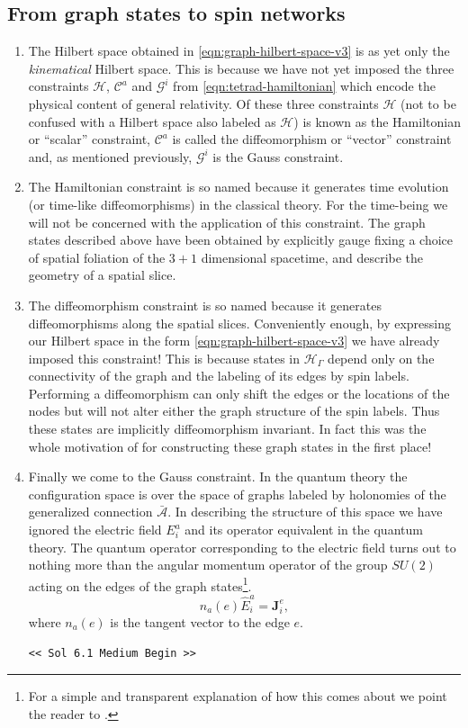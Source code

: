 \documentclass[preprint]{SciPost}
\newcommand{\mb}[1]{\mathbf{#1}}
\newcommand{\mc}[1]{\mathcal{#1}}
\theoremstyle{plain} %
\newcommand{\GPTBegin}{\par\noindent\textcolor{GPTMarker}{\texttt{\textless\textless{} Sol 6.1 Medium Begin \textgreater\textgreater}}\par}
\begin{document}
\subsection*{From graph states to spin networks}
	\begin{enumerate}[label=\arabic*.]
		\item The Hilbert space obtained in \eqref{eqn:graph-hilbert-space-v3} is as yet only the \emph{kinematical} Hilbert space. This is because we have not yet imposed the three constraints $ \mc{H} $, $ \mc{C}^a $ and $ \mc{G}^i $ from \eqref{eqn:tetrad-hamiltonian} which encode the physical content of general relativity. Of these three constraints $ \mc{H} $ (not to be confused with a Hilbert space also labeled as $ \mc{H} $) is known as the Hamiltonian or ``scalar'' constraint, $ \mc{C}^a $ is called the diffeomorphism or ``vector'' constraint and, as mentioned previously, $ \mc{G}^i $ is the Gauss constraint.
		\item The Hamiltonian constraint is so named because it generates time evolution (or time-like diffeomorphisms) in the classical theory. For the time-being we will not be concerned with the application of this constraint. The graph states described above have been obtained by explicitly gauge fixing a choice of spatial foliation of the $ 3+1 $ dimensional spacetime, and describe the geometry of a spatial slice.
		\item The diffeomorphism constraint is so named because it generates diffeomorphisms along the spatial slices. Conveniently enough, by expressing our Hilbert space in the form \eqref{eqn:graph-hilbert-space-v3} we have already imposed this constraint! This is because states in $ \mc{H}_\Gamma $ depend only on the connectivity of the graph and the labeling of its edges by spin labels. Performing a diffeomorphism can only shift the edges or the locations of the nodes but will not alter either the graph structure of the spin labels. Thus these states are implicitly diffeomorphism invariant. In fact this was the whole motivation of \cite{Ashtekar1994A-Manifestly} for constructing these graph states in the first place!
		\item Finally we come to the Gauss constraint. In the quantum theory the configuration space is over the space of graphs labeled by holonomies of the generalized connection $ \bar{\mc{A}} $. In describing the structure of this space we have ignored the electric field $ E^a_i $ and its operator equivalent in the quantum theory. The quantum operator corresponding to the electric field turns out to nothing more than the angular momentum operator of the group $ SU(2) $ acting on the edges of the graph states\footnote{For a simple and transparent explanation of how this comes about we point the reader to \cite[Sec 6.2]{Vaid2016LQG-for-the-Bewildered}.}.
		\begin{equation}\label{eqn:momentum-operator}
		n_a(e) \hat{E}^a_i = \mb{J}^e_i,
		\end{equation}
		where $ n_a(e) $ is the tangent vector to the edge $ e $. \GPTBegin{}


\end{enumerate}
\end{document}
